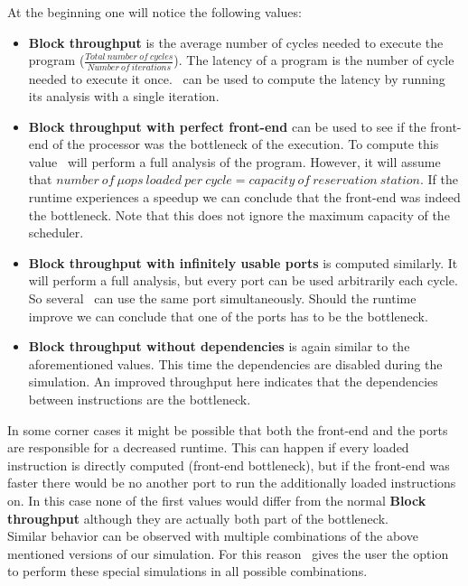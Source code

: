 At the beginning one will notice the following values:
\begin{itemize}
    \item \textbf{Block throughput} is the average number of cycles needed to execute the program ($\frac{Total\ number\ of\ cycles}{Number\ of\ iterations}$).
    The latency of a program is the number of cycle needed to execute it once. \suaca\ can be used to compute the latency by running its analysis with a single iteration.
    \item \textbf{Block throughput with perfect front-end} can be used to see if the front-end of the processor was the bottleneck of the execution. To compute this value \suaca\ will perform a full analysis of the program. However, it will assume that $number\ of\ \mu ops\ loaded\ per\ cycle = capacity\ of\ reservation\ station$. If the runtime experiences a speedup we can conclude that the front-end was indeed the bottleneck. Note that this does not ignore the maximum capacity of the scheduler.
    \item \textbf{Block throughput with infinitely usable ports} is computed similarly. It will perform a full analysis, but every port can be used arbitrarily each cycle. So several \microops\ can use the same port simultaneously. Should the runtime improve we can conclude that one of the ports has to be the bottleneck.
    \item \textbf{Block throughput without dependencies} is again similar to the aforementioned values. This time the dependencies are disabled during the simulation. An improved throughput here indicates that the dependencies between instructions are the bottleneck. 
\end{itemize}

In some corner cases it might be possible that both the front-end and the ports are responsible for a decreased runtime. This can happen if every loaded instruction is directly computed (front-end bottleneck), but if the front-end was faster there would be no another port to run the additionally loaded instructions on. In this case none of the first values would differ from the normal \textbf{Block throughput} although they are actually both part of the bottleneck.\\
Similar behavior can be observed with multiple combinations of the above mentioned versions of our simulation. For this reason \suaca\ gives the user the option to perform these special simulations in all possible combinations.\\


